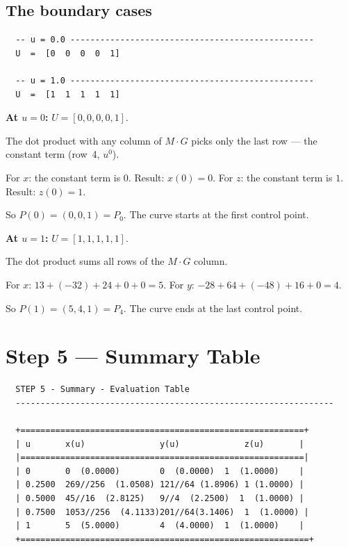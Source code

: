 \documentclass[12pt, a4paper]{article}
\begin{document}
\subsection{The boundary cases}

\begin{verbatim}
  -- u = 0.0 -------------------------------------------------
  U  =  [0  0  0  0  1]

  -- u = 1.0 -------------------------------------------------
  U  =  [1  1  1  1  1]
\end{verbatim}

\begin{examplebox}
\textbf{At $u = 0$:} $U = [0, 0, 0, 0, 1]$.

The dot product with any column of $M \cdot G$ picks
only the last row --- the constant term (row~4, $u^0$).

For $x$: the constant term is $0$. Result: $x(0) = 0$.
For $z$: the constant term is $1$. Result: $z(0) = 1$.

So $P(0) = (0, 0, 1) = P_0$. \checkmark
The curve starts at the first control point.

\medskip
\textbf{At $u = 1$:} $U = [1, 1, 1, 1, 1]$.

The dot product sums all rows of the $M \cdot G$ column.

For $x$: $13 + (-32) + 24 + 0 + 0 = 5$. \checkmark
For $y$: $-28 + 64 + (-48) + 16 + 0 = 4$. \checkmark

So $P(1) = (5, 4, 1) = P_4$. \checkmark
The curve ends at the last control point.
\end{examplebox}


\section{Step 5 --- Summary Table}

\begin{verbatim}
  STEP 5 - Summary - Evaluation Table
  ----------------------------------------------------------------

  +=========================================================+
  | u       x(u)               y(u)             z(u)       |
  |=========================================================|
  | 0       0  (0.0000)        0  (0.0000)  1  (1.0000)    |
  | 0.2500  269//256  (1.0508) 121//64 (1.8906) 1 (1.0000) |
  | 0.5000  45//16  (2.8125)   9//4  (2.2500)  1  (1.0000) |
  | 0.7500  1053//256  (4.1133)201//64(3.1406)  1  (1.0000) |
  | 1       5  (5.0000)        4  (4.0000)  1  (1.0000)    |
  +==========================================================+
\end{verbatim}
\end{document}
